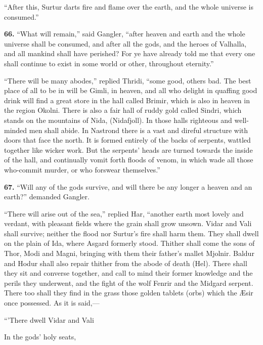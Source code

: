 ``After this, Surtur darts fire and flame over the earth, and the
whole universe is consumed.''


\textbf{66.} ``What will remain,'' said Gangler, ``after heaven and earth and
the whole universe shall be consumed, and after all the gods, and the
heroes of Valhalla, and all mankind shall have perished? For ye have
already told me that every one shall continue to exist in some world
or other, throughout eternity.''

``There will be many abodes,'' replied Thridi, ``some good, others bad.
The best place of all to be in will be Gimli, in heaven, and all who
delight in quaffing good drink will find a great store in the hall
called Brimir, which is also in heaven in the region Okolni. There is
also a fair hall of ruddy gold called Sindri, which stands on the
mountains of Nida, (Nidafjoll). In those halls righteous and
well-minded men shall abide. In Nastrond there is a vast and direful
structure with doors that face the north. It is formed entirely of the
backs of serpents, wattled together like wicker work. But the
serpents' heads are turned towards the inside of the hall, and
continually vomit forth floods of venom, in which wade all those
who-commit murder, or who forswear themselves.''


\textbf{67.} ``Will any of the gods survive, and will there be any longer a
heaven and an earth?'' demanded Gangler.

``There will arise out of the sea,'' replied Har, ``another earth most
lovely and verdant, with pleasant fields where the grain shall grow
unsown. Vidar and Vali shall survive; neither the flood nor Surtur's
fire shall harm them. They shall dwell on the plain of Ida, where
Asgard formerly stood. Thither shall come the sons of Thor, Modi and
Magni, bringing with them their father's mallet Mjolnir. Baldur and
Hodur shall also repair thither from the abode of death (Hel). There
shall they sit and converse together, and call to mind their former
knowledge and the perils they underwent, and the fight of the wolf
Fenrir and the Midgard serpent. There too shall they find in the grass
those golden tablets (orbs) which the Æsir once possessed. As it is
said,—

``'There dwell Vidar and Vali

In the gods' holy seats,

